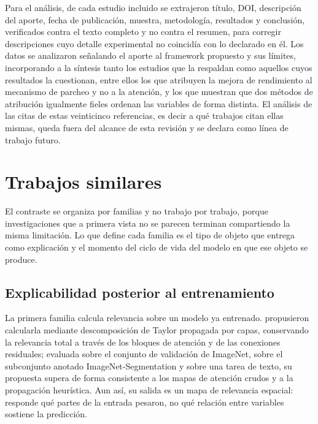 Para el análisis, de cada estudio incluido se extrajeron título, DOI, descripción del aporte, fecha de publicación, muestra, metodología, resultados y conclusión, verificados contra el texto completo y no contra el resumen, para corregir descripciones cuyo detalle experimental no coincidía con lo declarado en él. Los datos se analizaron señalando el aporte al framework propuesto y sus límites, incorporando a la síntesis tanto los estudios que la respaldan como aquellos cuyos resultados la cuestionan, entre ellos los que atribuyen la mejora de rendimiento al mecanismo de parcheo y no a la atención, y los que muestran que dos métodos de atribución igualmente fieles ordenan las variables de forma distinta. El análisis de las citas de estas veinticinco referencias, es decir a qué trabajos citan ellas mismas, queda fuera del alcance de esta revisión y se declara como línea de trabajo futuro.

\section{Trabajos similares}

El contraste se organiza por familias y no trabajo por trabajo, porque investigaciones que a primera vista no se parecen terminan compartiendo la misma limitación. Lo que define cada familia es el tipo de objeto que entrega como explicación y el momento del ciclo de vida del modelo en que ese objeto se produce.

\subsection{Explicabilidad posterior al entrenamiento}

La primera familia calcula relevancia sobre un modelo ya entrenado. \textcite{chefer2021transformer} propusieron calcularla mediante descomposición de Taylor propagada por capas, conservando la relevancia total a través de los bloques de atención y de las conexiones residuales; evaluada sobre el conjunto de validación de ImageNet, sobre el subconjunto anotado ImageNet-Segmentation y sobre una tarea de texto, su propuesta supera de forma consistente a los mapas de atención crudos y a la propagación heurística. Aun así, su salida es un mapa de relevancia espacial: responde qué partes de la entrada pesaron, no qué relación entre variables sostiene la predicción.

